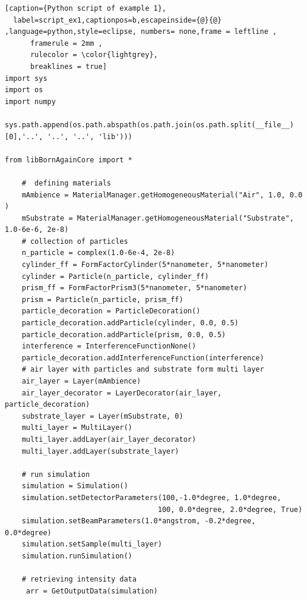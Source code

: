 \begin{lstlisting}[caption={Python script of example 1},
  label=script_ex1,captionpos=b,escapeinside={@}{@} ,language=python,style=eclipse, numbers= none,frame = leftline ,
      framerule = 2mm ,
      rulecolor = \color{lightgrey},
      breaklines = true]
import sys 
import os
import numpy 

sys.path.append(os.path.abspath(os.path.join(os.path.split(__file__)[0],'..', '..', '..', 'lib')))

from libBornAgainCore import * 

    #  defining materials 
    mAmbience = MaterialManager.getHomogeneousMaterial("Air", 1.0, 0.0 ) 
    mSubstrate = MaterialManager.getHomogeneousMaterial("Substrate", 1.0-6e-6, 2e-8) 
    # collection of particles 
    n_particle = complex(1.0-6e-4, 2e-8) 
    cylinder_ff = FormFactorCylinder(5*nanometer, 5*nanometer) 
    cylinder = Particle(n_particle, cylinder_ff) 
    prism_ff = FormFactorPrism3(5*nanometer, 5*nanometer) 
    prism = Particle(n_particle, prism_ff) 
    particle_decoration = ParticleDecoration()  
    particle_decoration.addParticle(cylinder, 0.0, 0.5)  
    particle_decoration.addParticle(prism, 0.0, 0.5)  
    interference = InterferenceFunctionNone()  
    particle_decoration.addInterferenceFunction(interference)  
    # air layer with particles and substrate form multi layer 
    air_layer = Layer(mAmbience)  
    air_layer_decorator = LayerDecorator(air_layer, particle_decoration) 
    substrate_layer = Layer(mSubstrate, 0) 
    multi_layer = MultiLayer()  
    multi_layer.addLayer(air_layer_decorator) 
    multi_layer.addLayer(substrate_layer) 

    # run simulation  
    simulation = Simulation()  
    simulation.setDetectorParameters(100,-1.0*degree, 1.0*degree, 
                                    100, 0.0*degree, 2.0*degree, True) 
    simulation.setBeamParameters(1.0*angstrom, -0.2*degree, 0.0*degree) 
    simulation.setSample(multi_layer) 
    simulation.runSimulation()  

    # retrieving intensity data
     arr = GetOutputData(simulation)
\end{lstlisting}



